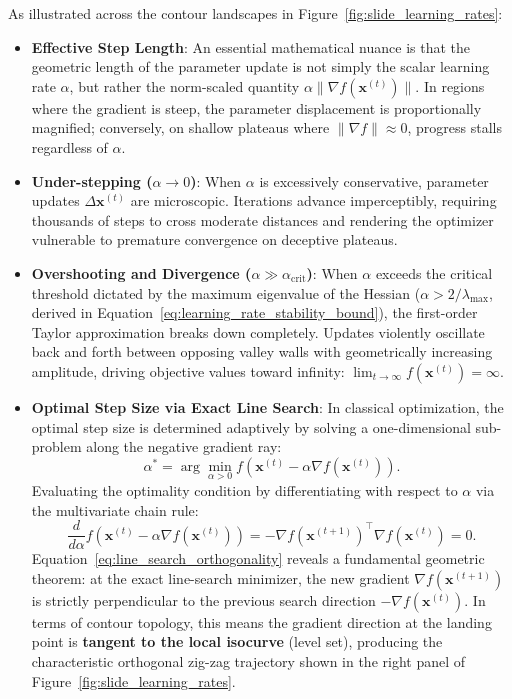 As illustrated across the contour landscapes in Figure~\ref{fig:slide_learning_rates}:
\begin{itemize}
  \item \textbf{Effective Step Length}: An essential mathematical nuance is that the geometric length of the parameter update is not simply the scalar learning rate $\alpha$, but rather the norm-scaled quantity $\alpha \|\nabla f(\mathbf{x}^{(t)})\|$. In regions where the gradient is steep, the parameter displacement is proportionally magnified; conversely, on shallow plateaus where $\|\nabla f\| \approx 0$, progress stalls regardless of $\alpha$.
  \item \textbf{Under-stepping ($\alpha \to 0$)}: When $\alpha$ is excessively conservative, parameter updates $\Delta \mathbf{x}^{(t)}$ are microscopic. Iterations advance imperceptibly, requiring thousands of steps to cross moderate distances and rendering the optimizer vulnerable to premature convergence on deceptive plateaus.
  \item \textbf{Overshooting and Divergence ($\alpha \gg \alpha_{\text{crit}}$)}: When $\alpha$ exceeds the critical threshold dictated by the maximum eigenvalue of the Hessian ($\alpha > 2/\lambda_{\max}$, derived in Equation~\eqref{eq:learning_rate_stability_bound}), the first-order Taylor approximation breaks down completely. Updates violently oscillate back and forth between opposing valley walls with geometrically increasing amplitude, driving objective values toward infinity: $\lim_{t \to \infty} f(\mathbf{x}^{(t)}) = \infty$.
  \item \textbf{Optimal Step Size via Exact Line Search}: In classical optimization, the optimal step size is determined adaptively by solving a one-dimensional sub-problem along the negative gradient ray:
    \begin{equation}
    \alpha^* = \arg\min_{\alpha > 0} f\left(\mathbf{x}^{(t)} - \alpha \nabla f(\mathbf{x}^{(t)})\right).
    \label{eq:exact_line_search}
    \end{equation}
    Evaluating the optimality condition by differentiating with respect to $\alpha$ via the multivariate chain rule:
    \begin{equation}
    \frac{d}{d\alpha} f\left(\mathbf{x}^{(t)} - \alpha \nabla f(\mathbf{x}^{(t)})\right) = -\nabla f\left(\mathbf{x}^{(t+1)}\right)^\top \nabla f\left(\mathbf{x}^{(t)}\right) = 0.
    \label{eq:line_search_orthogonality}
    \end{equation}
    Equation~\eqref{eq:line_search_orthogonality} reveals a fundamental geometric theorem: at the exact line-search minimizer, the new gradient $\nabla f(\mathbf{x}^{(t+1)})$ is strictly perpendicular to the previous search direction $-\nabla f(\mathbf{x}^{(t)})$. In terms of contour topology, this means the gradient direction at the landing point is \textbf{tangent to the local isocurve} (level set), producing the characteristic orthogonal zig-zag trajectory shown in the right panel of Figure~\ref{fig:slide_learning_rates}.
\end{itemize}

